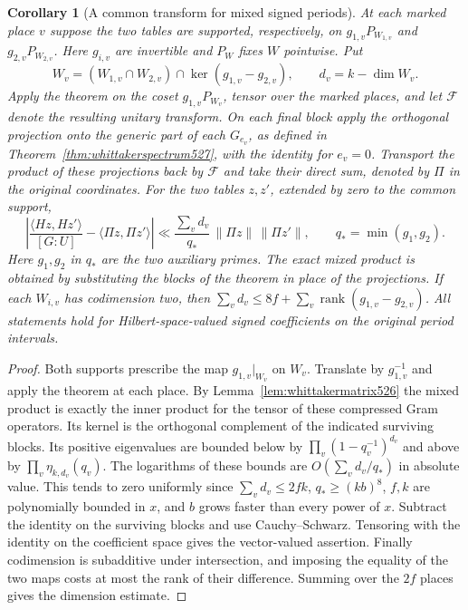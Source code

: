 \documentclass[a4paper,11pt]{article}
\newtheorem{corollary}[proposition]{Corollary}
\theoremstyle{definition}
\theoremstyle{remark}
\numberwithin{equation}{section}
\begin{document}
\begin{corollary}[A common transform for mixed signed periods]
\leavevmode\label{cor:mixedrestrictions626}
At each marked place \(v\) suppose the two tables are supported,
respectively, on \(g_{1,v}P_{W_{1,v}}\) and \(g_{2,v}P_{W_{2,v}}\).
Here \(g_{i,v}\) are invertible and \(P_W\) fixes \(W\) pointwise.
Put
\[
 W_v=(W_{1,v}\cap W_{2,v})\cap\ker(g_{1,v}-g_{2,v}),\qquad
 d_v=k-\dim W_v .
\]
Apply the theorem on the coset \(g_{1,v}P_{W_v}\), tensor over the
marked places, and let \(\mathcal F\) denote the resulting unitary
transform. On each final block apply the orthogonal projection onto
the generic part of each \(G_{e_v}\), as defined in
Theorem~\ref{thm:whittakerspectrum527}, with the identity for \(e_v=0\).
Transport the product of these projections back by \(\mathcal F\)
and take their direct sum, denoted by \(\Pi\) in the original coordinates.
For the two tables \(z,z'\), extended by zero to the common support,
\[
 \left|\frac{\langle Hz,Hz'\rangle}{[G:U]}
                -\langle\Pi z,\Pi z'\rangle\right|
 \ll \frac{\sum_v d_v}{q_*}\,\|\Pi z\|\,\|\Pi z'\|,
 \qquad q_*=\min(g_1,g_2).
\]
Here \(g_1,g_2\) in \(q_*\) are the two auxiliary primes. The exact
mixed product is obtained by substituting the blocks of the theorem
in place of the projections. If each \(W_{i,v}\) has codimension two,
then
\(\sum_v d_v\le 8f+\sum_v\operatorname{rank}(g_{1,v}-g_{2,v})\).
All statements hold for Hilbert-space-valued signed coefficients on
the original period intervals.
\end{corollary}
\begin{proof}
Both supports prescribe the map \(g_{1,v}|_{W_v}\) on \(W_v\).
Translate by \(g_{1,v}^{-1}\) and apply the theorem at each place.
By Lemma~\ref{lem:whittakermatrix526} the mixed product is exactly
the inner product for the tensor of these compressed Gram operators.
Its kernel is the orthogonal complement of the indicated surviving
blocks. Its positive eigenvalues are bounded below by
\(\prod_v(1-q_v^{-1})^{d_v}\) and above by
\(\prod_v\eta_{k,d_v}(q_v)\). The logarithms of these bounds are
\(O(\sum_v d_v/q_*)\) in absolute value. This tends to zero uniformly
since \(\sum_v d_v\le 2fk\), \(q_*\ge(kb)^8\), \(f,k\) are
polynomially bounded in \(x\), and \(b\) grows faster than every
power of \(x\). Subtract the identity on the surviving blocks and
use Cauchy--Schwarz. Tensoring with the identity on the coefficient
space gives the vector-valued assertion. Finally codimension is
subadditive under intersection, and imposing the equality of the two
maps costs at most the rank of their difference. Summing over the
\(2f\) places gives the dimension estimate.
\end{proof}
\end{document}
